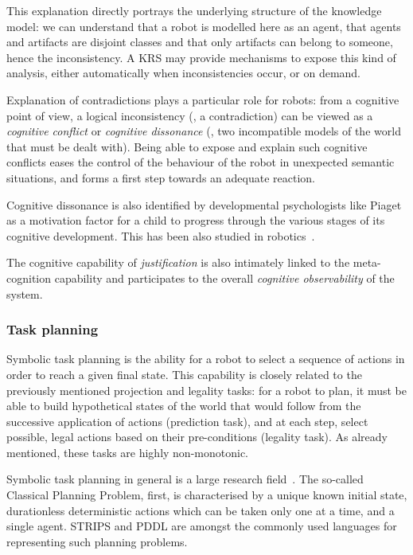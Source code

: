 This explanation directly portrays the underlying structure of the knowledge
model: we can understand that a robot is modelled here as an agent, that agents
and artifacts are disjoint classes and that only artifacts can belong to
someone, hence the inconsistency. A KRS may provide mechanisms to expose this
kind of analysis, either automatically when inconsistencies occur, or on
demand.

Explanation of contradictions plays a particular role for robots: from a
cognitive point of view, a logical inconsistency (\ie, a contradiction) can be
viewed as a \emph{cognitive conflict} or \emph{cognitive dissonance} (\ie, two
incompatible models of the world that must be dealt with). Being able to expose
and explain such cognitive conflicts eases the control of the behaviour of the
robot in unexpected semantic situations, and forms a first step towards an
adequate reaction.

Cognitive dissonance is also identified by developmental psychologists like
Piaget as a motivation factor for a child to progress through the various
stages of its cognitive development. This has been also studied in
robotics~\cite{Oudeyer2007}.


The cognitive capability of \emph{justification} is also intimately linked to
the meta-cognition capability and participates to the overall \emph{cognitive
observability} of the system.

\subsubsection{Task planning}
\label{sect|planning}

Symbolic task planning is the ability for a robot to select a sequence of
actions in order to reach a given final state. This capability is closely
related to the previously mentioned projection and legality tasks: for a robot
to plan, it must be able to build hypothetical states of the world that would
follow from the successive application of actions (prediction task), and at
each step, select possible, legal actions based on their pre-conditions
(legality task). As already mentioned, these tasks are highly non-monotonic.


Symbolic task planning in general is a large research
field~\cite{Russell2009planning}. The so-called Classical Planning Problem,
first, is characterised by a unique known initial state, durationless
deterministic actions which can be taken only one at a time, and a single
agent. STRIPS and PDDL are amongst the commonly used languages for representing
such planning problems.

